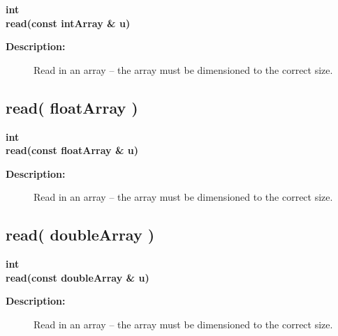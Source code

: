 \begin{flushleft} \textbf{%
int  \\ 
\settowidth{\FortranIOIncludeArgIndent}{read(}%
read(const intArray \& u)
}\end{flushleft}
\begin{description}
\item[{\bf Description:}] 
   Read in an array -- the array must be dimensioned to the correct size.
\end{description}
\subsection{read( floatArray )}
 
\begin{flushleft} \textbf{%
int  \\ 
\settowidth{\FortranIOIncludeArgIndent}{read(}%
read(const floatArray \& u)
}\end{flushleft}
\begin{description}
\item[{\bf Description:}] 
   Read in an array -- the array must be dimensioned to the correct size.
\end{description}
\subsection{read( doubleArray )}
 
\begin{flushleft} \textbf{%
int  \\ 
\settowidth{\FortranIOIncludeArgIndent}{read(}%
read(const doubleArray \& u)
}\end{flushleft}
\begin{description}
\item[{\bf Description:}] 
   Read in an array -- the array must be dimensioned to the correct size.
\end{description}
